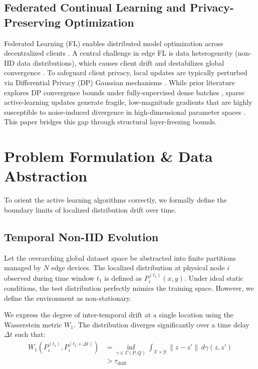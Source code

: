 \documentclass[conference]{IEEEtran}
\begin{document}
\subsection{Federated Continual Learning and Privacy-Preserving Optimization}
Federated Learning (FL) enables distributed model optimization across decentralized clients \cite{b29, b35}. A central challenge in edge FL is data heterogeneity (non-IID data distributions), which causes client drift and destabilizes global convergence \cite{b7, b30}. To safeguard client privacy, local updates are typically perturbed via Differential Privacy (DP) Gaussian mechanisms \cite{b34, b31}. While prior literature explores DP convergence bounds under fully-supervised dense batches \cite{b32}, sparse active-learning updates generate fragile, low-magnitude gradients that are highly susceptible to noise-induced divergence in high-dimensional parameter spaces \cite{b13}. This paper bridges this gap through structural layer-freezing bounds.

\section{Problem Formulation \& Data Abstraction}

To orient the active learning algorithms correctly, we formally define the boundary limits of localized distribution drift over time.

\subsection{Temporal Non-IID Evolution}
Let the overarching global dataset space be abstracted into finite partitions managed by $N$ edge devices. The localized distribution at physical node $i$ observed during time window $t_1$ is defined as $P_{i}^{(t_1)}(x,y)$. Under ideal static conditions, the test distribution perfectly mimics the training space. However, we define the environment as non-stationary.

We express the degree of inter-temporal drift at a single location using the Wasserstein metric $W_1$. The distribution diverges significantly over a time delay $\Delta t$ such that:
\begin{equation}
\begin{aligned}
W_1(P_i^{(t_1)}, P_i^{(t_1 + \Delta t)}) &= \inf_{\gamma \in \Gamma(P, Q)} \int_{\mathcal{X} \times \mathcal{Y}} \|z - z'\| \, d\gamma(z, z') \\
&> \tau_{\mathrm{drift}}
\end{aligned}
\end{equation}
\end{document}
